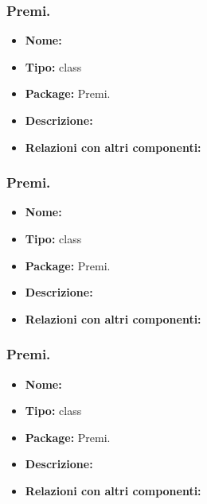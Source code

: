 \subsubsection{Premi.}
\begin{itemize}
  \item \textbf{Nome:}
  \item \textbf{Tipo:} class
  \item \textbf{Package:} Premi.
  \item \textbf{Descrizione:}
  \item \textbf{Relazioni con altri componenti:} 
\end{itemize}
\subsubsection{Premi.}
\begin{itemize}
  \item \textbf{Nome:}
  \item \textbf{Tipo:} class
  \item \textbf{Package:} Premi.
  \item \textbf{Descrizione:}
  \item \textbf{Relazioni con altri componenti:} 
\end{itemize}
\subsubsection{Premi.}
\begin{itemize}
  \item \textbf{Nome:}
  \item \textbf{Tipo:} class
  \item \textbf{Package:} Premi.
  \item \textbf{Descrizione:}
  \item \textbf{Relazioni con altri componenti:} 
\end{itemize}












